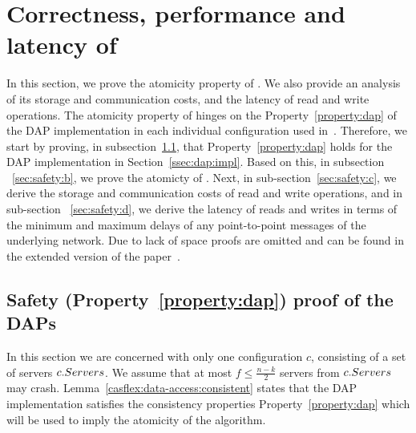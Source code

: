 \section{Correctness,  performance and latency  of \ares{}}\label{sec:ares_safety}
In this section, we prove the atomicity property of \ares{}. We also provide an analysis of its storage and communication costs, and the 
latency of read and write operations. The atomicity property of \ares{} hinges on the Property~\ref{property:dap} 
of the DAP implementation in each individual configuration used in~\ares{}. Therefore, we start by proving, in subsection~\ref{sec:safety:a},  that 
Property~\ref{property:dap} holds for the DAP implementation in Section~\ref{ssec:dap:impl}. 
Based on this, in subsection ~\ref{sec:safety:b}, we prove the atomicty of \ares{}. Next, in sub-section~\ref{sec:safety:c}, we derive the storage
and communication costs of read and write operations, and in sub-section ~\ref{sec:safety:d}, we derive the latency
of reads and writes in terms of the minimum and maximum delays of any point-to-point messages of the 
underlying network.
Due to lack of space proofs are omitted and can be found in the 
extended version of the paper~\cite{ARES:Arxiv:2018}.	

\subsection{Safety (Property~\ref{property:dap})  proof of the DAP{s}}\label{sec:safety:a}
In this section we are concerned with only one configuration $c$, consisting of a set of servers 
$c.Servers$.
We assume that at most $f \leq \frac{n-k}{2}$ servers from $c.Servers$ may crash.  
Lemma~\ref{casflex:data-access:consistent} states that the DAP implementation 
 satisfies the  consistency properties Property~\ref{property:dap}  which will be used to 
imply the atomicity of the \ares{} algorithm. 
\label{sec:primitives}

						
